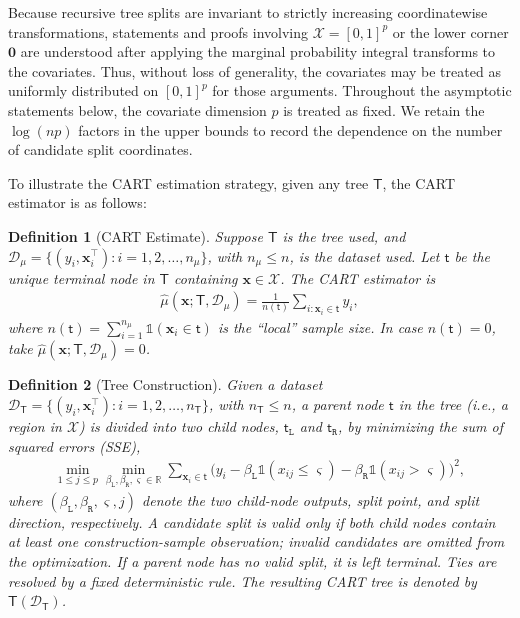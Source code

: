 \documentclass[10pt]{article}
\def\treeT{\mathsf{T}}
\def\nodet{\mathsf{t}}
\def\bx{\mathbf{x}}
\def\X{\mathcal{X}}
\def\reals{\mathbb{R}}
\newcommand{\Indicator}{\mathds{1}}
\newtheorem{definition}{Definition}
\theoremstyle{definition}
\theoremstyle{remark}
\begin{document}
Because recursive tree splits are invariant to strictly increasing coordinatewise transformations, statements and proofs involving $\mathcal{X}=[0,1]^p$ or the lower corner $\mathbf{0}$ are understood after applying the marginal probability integral transforms to the covariates. Thus, without loss of generality, the covariates may be treated as uniformly distributed on $[0,1]^p$ for those arguments.
Throughout the asymptotic statements below, the covariate dimension $p$ is treated as fixed. We retain the $\log(np)$ factors in the upper bounds to record the dependence on the number of candidate split coordinates.

To illustrate the CART estimation strategy, given any tree $\treeT$, the CART estimator is as follows:


    
\begin{definition}[CART Estimate]\label{sa-defn: cart outcome}
Suppose $\treeT$ is the tree used, and $\mathcal{D}_{\mu}=\{(y_i, \bx^\top_i):i=1,2,\dots,n_{\mu}\}$, with $n_{\mu}\leq n$, is the dataset used. Let $\nodet$ be the unique terminal node in $\treeT$ containing $\bx \in \X$. The CART estimator is
\begin{align*}
            \hat\mu(\bx; \treeT,\mathcal{D}_{\mu})
            = \frac{1}{n(\nodet)} \sum_{i:\bx_i \in \nodet}  y_i,
\end{align*}
where $n(\nodet) = \sum_{i=1}^{n_{\mu}} \Indicator(\bx_i \in \nodet)$ is the ``local'' sample size. In case $n(\nodet) = 0$, take $\hat\mu(\bx; \treeT,\mathcal{D}_{\mu}) = 0$.
\end{definition}



\begin{definition}[Tree Construction]\label{sa-defn: cart construction}
    Given a dataset $\mathcal{D}_{\treeT} = \{(y_i,\bx^\top_i):i=1,2,\dots,n_{\treeT}\}$, with $n_{\treeT}\leq n$, a parent node $\nodet$ in the tree (i.e., a region in $\mathcal{X}$) is divided into two child nodes, $\nodet_{\mathtt{L}}$ and $\nodet_{\mathtt{R}}$, by minimizing the sum of squared errors (SSE),
\begin{align} \label{eq:sse}
    \min_{1\leq j\leq p} \min_{\beta_{\mathtt{L}},\beta_{\mathtt{R}},\varsigma \in \reals}
    \sum_{\bx_i \in \nodet} \big(y_{i} - \beta_{\mathtt{L}} \Indicator(x_{ij} \leq \varsigma) - \beta_{\mathtt{R}} \Indicator(x_{ij} > \varsigma) \big)^2,
\end{align}
where $(\beta_{\mathtt{L}}, \beta_{\mathtt{R}}, \varsigma, j)$ denote the two child-node outputs, split point, and split direction, respectively. A candidate split is valid only if both child nodes contain at least one construction-sample observation; invalid candidates are omitted from the optimization. If a parent node has no valid split, it is left terminal. Ties are resolved by a fixed deterministic rule. The resulting CART tree is denoted by $\treeT(\mathcal{D}_{\treeT})$.
\end{definition}
\end{document}
